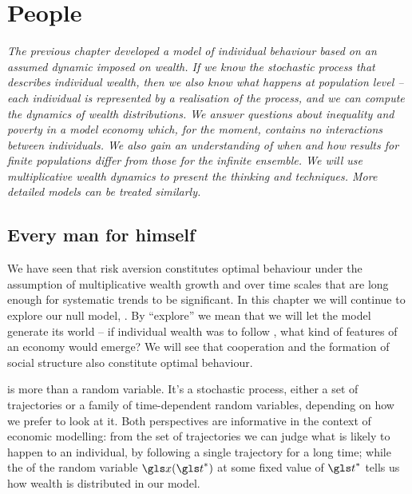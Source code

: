 
\chapter{People}
{\it 
The previous chapter developed a model of individual behaviour based on an
assumed dynamic imposed on wealth. If we know the stochastic process that describes
individual wealth, then we also know what happens at population level -- each individual
is represented by a realisation of the process, and we can compute 
the dynamics of wealth distributions. We answer questions about inequality and poverty in
a model economy which, for the moment, contains no interactions between individuals. We also gain an understanding of when and how results for finite populations differ from those for the infinite ensemble. We will use multiplicative wealth dynamics to present the thinking and techniques. More detailed models can be treated similarly.}
\newpage


\section{Every man for himself}

We have seen that risk aversion constitutes optimal behaviour under the assumption 
of multiplicative wealth growth and over time scales that are long enough for systematic 
trends to be significant. In this chapter we will continue to explore our null model, 
\GBM. By ``explore'' we mean that we will let the model generate its world -- if 
individual wealth was to follow \GBM, what kind of features of an economy would emerge? 
We will see that cooperation and the formation of social structure also constitute 
optimal behaviour.

\GBM is more than a random variable. It's a stochastic process, either a set of trajectories 
or a family of time-dependent random variables, depending on how we 
prefer to look at it.  Both perspectives are informative in the context of economic modelling:
from the set of trajectories we can judge what is likely to happen to an individual, 
\eg by following a single trajectory for a long time; while the \PDFa of the random 
variable $\x(\t^*)$ at some fixed value of $\t^*$ tells us how wealth is distributed in our model. 

